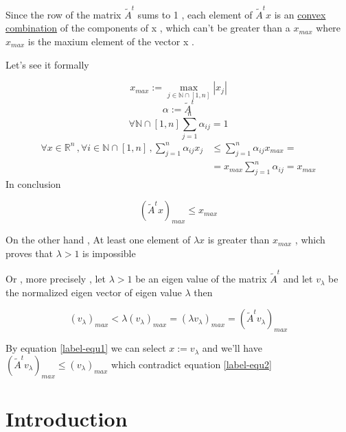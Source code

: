 \documentclass[9pt,twocolumn]{article}
\theoremstyle{definition}
\begin{document}
Since the row of the matrix \(\tilde{A}^t\) sums to 1 , each element of \(\tilde{A}^tx\) is an
\href{https://en.wikipedia.org/wiki/Convex\_combination}{convex combination} of the components of x , which can't be greater than a \(x_{max}\) where \(x_{max}\) is the maxium
element of the vector x .

Let's see it formally

\[
x_{max} := \max_{j\in\mathbb{N}\cap [1,n]}{|x_j|}
\]
\[
\alpha := \tilde{A}^t
\]
\[
\forall \mathbb{N}\cap [1,n] \sum_{j=1}^{n} \alpha_{ij} = 1
\]
\begin{align*}
\forall x\in \mathbb{R}^{n} \,, \forall i\in\mathbb{N}\cap [1,n]  \,, \sum_{j=1}^n\alpha _{ij} x_{j}  &\leq\sum_{j=1}^n \alpha_{ij}x_{max}= \\
                                                                    &=x_{max} \sum_{j=1}^{n} \alpha_{ij} = x_{max}
\end{align*}
In conclusion

\begin{equation}
\label{label-equ1}
(\tilde{A}^t x)_{max} \leq x_{max}
\end{equation}

On the other hand , At least one element of \(\lambda x\) is greater than \(x_{max}\) , which proves that
\(\lambda > 1\) is impossible

Or , more precisely , let \(\lambda > 1\) be an eigen value of the matrix
\(\tilde{A}^t\) and let \(v_{\lambda}\) be the normalized eigen vector of
eigen value \(\lambda\) then

\begin{equation}
\label{label-equ2}
(v_{\lambda})_{max} <
\lambda (v_{\lambda})_{max} =
( \lambda v_{\lambda} )_{max} =
( \tilde{A}^t v_{\lambda} )_{max}
\end{equation}

By equation \ref{label-equ1} we can select \(x:=v_{\lambda}\) and we'll have
\((\tilde{A}^t v_{\lambda})_{max} \leq (v_{\lambda})_{max}\) which contradict equation \ref{label-equ2}





\section*{Introduction}
\label{sec:org7ade61d}
\end{document}
